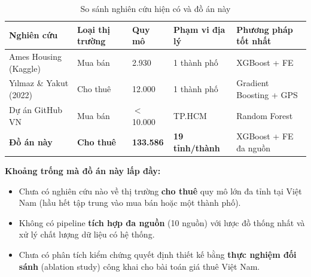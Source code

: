 \begin{table}[H]
  \centering
  \caption{So sánh nghiên cứu hiện có và đồ án này}
  \label{tab:gap}
  \small
  \begin{tabularx}{\textwidth}{@{}L{3.8cm} C{1.8cm} C{2.0cm} C{2.2cm} C{3.0cm}@{}}
    \toprule
    \textbf{Nghiên cứu} &
    \textbf{Loại thị trường} &
    \textbf{Quy mô} &
    \textbf{Phạm vi địa lý} &
    \textbf{Phương pháp tốt nhất} \\
    \midrule
    Ames Housing (Kaggle) &
      Mua bán & 2.930 & 1 thành phố & XGBoost + FE \\
    Yılmaz \& Yakut (2022) &
      Cho thuê & 12.000 & 1 thành phố & Gradient Boosting + GPS \\
    Dự án GitHub VN &
      Mua bán & $<$10.000 & TP.HCM & Random Forest \\
    \midrule
    \textbf{Đồ án này} &
      \textbf{Cho thuê} & \textbf{133.586} & \textbf{19 tỉnh/thành} &
      XGBoost + FE đa nguồn \\
    \bottomrule
  \end{tabularx}
\end{table}

\textbf{Khoảng trống mà đồ án này lấp đầy:}
\begin{itemize}[leftmargin=*, itemsep=3pt]
  \item Chưa có nghiên cứu nào về thị trường \textbf{cho thuê} quy mô lớn đa tỉnh
        tại Việt Nam (hầu hết tập trung vào mua bán hoặc một thành phố).
  \item Không có pipeline \textbf{tích hợp đa nguồn} (10 nguồn) với lược đồ thống nhất
        và xử lý chất lượng dữ liệu có hệ thống.
  \item Chưa có phân tích kiểm chứng quyết định thiết kế bằng \textbf{thực nghiệm đối sánh}
        (ablation study) công khai cho bài toán giá thuê Việt Nam.
\end{itemize}
